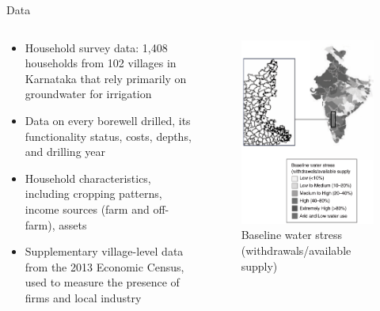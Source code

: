 \documentclass[10pt]{beamer}
\begin{document}
\begin{frame}
	{Data}
	\begin{columns}
		\begin{column}{0.7\textwidth}
			\begin{itemize}
				\item Household survey data: 1,408 households from 102 villages in Karnataka that rely primarily on groundwater for irrigation
				\item Data on every borewell drilled, its functionality status, costs, depths, and drilling year
				\item Household characteristics, including cropping patterns, income sources (farm and off-farm), assets
				\item Supplementary village-level data from the 2013 Economic Census, used to measure the presence of firms and local industry
			\end{itemize}
		\end{column}
		\begin{column}{0.3\textwidth}
			\centering
			\begin{figure}
				\centering
				\includegraphics[width=1\textwidth]{figure1_left.png}
				\caption{Baseline water stress (withdrawals/available supply)}
			\end{figure}
		\end{column}
	\end{columns}
\end{frame}
\end{document}
